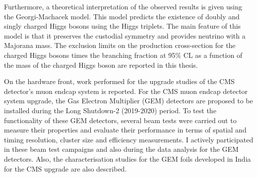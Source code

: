 Furthermore, a theoretical interpretation of the observed results is given using the Georgi-Machacek model. This model predicts the existence of doubly and singly charged Higgs bosons using the Higgs triplets. The main feature of this model is that it preserves the custodial symmetry and provides neutrino with a Majorana mass. The exclusion limits on the production cross-section for the charged Higgs bosons times the branching fraction at 95\% CL as a function of the mass of the charged Higgs boson are reported in this thesis.



On the hardware front, work performed for the upgrade studies of the CMS detector's muon endcap system is reported. For the CMS muon endcap detector system upgrade, the Gas Electron Multiplier (GEM) detectors are proposed to be installed during the Long Shutdown-2 (2019-2020) period. To test the functionality of these GEM detectors, several beam tests were carried out to measure their properties and evaluate their performance in terms of spatial and timing resolution, cluster size and efficiency measurements. I actively participated in these beam test campaigns and also during the data analysis for the GEM detectors. Also, the characterisation studies for the GEM foils developed in India for the CMS upgrade are also described.
